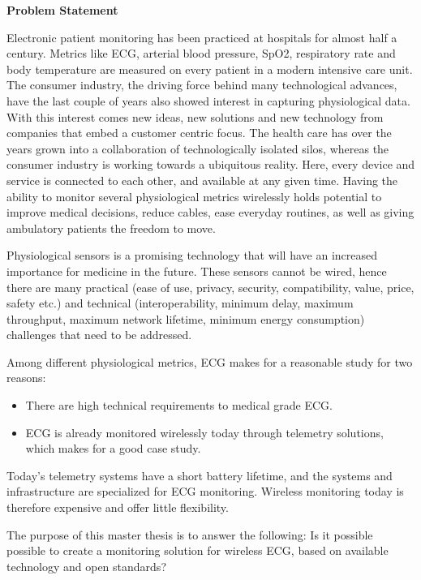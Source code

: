 
\noindent \textbf{Problem Statement} 
\newline 

\noindent Electronic patient monitoring has been practiced at hospitals for almost half a century. Metrics like ECG, arterial blood pressure, SpO2, respiratory rate and body temperature are measured on every patient in a modern intensive care unit. The consumer industry, the driving force behind many technological advances, have the last couple of years also showed interest in capturing physiological data. With this interest comes new ideas, new solutions and new technology from companies that embed a customer centric focus. The health care has over the years grown into a collaboration of technologically isolated silos, whereas the consumer industry is working towards a ubiquitous reality. Here, every device and service is connected to each other, and available at any given time. Having the ability to monitor several physiological metrics wirelessly holds potential to improve medical decisions, reduce cables, ease everyday routines, as well as giving ambulatory patients the freedom to move. 

Physiological sensors is a promising technology that will have an increased importance for medicine in the future. These sensors cannot be wired, hence there are many practical (ease of use, privacy, security, compatibility, value, price, safety etc.) and technical (interoperability, minimum delay, maximum throughput, maximum network lifetime, minimum energy consumption) challenges that need to be addressed.

Among different physiological metrics, ECG makes for a reasonable study for two reasons: 
\begin{itemize}
	\item There are high technical requirements to medical grade ECG. 
	\item ECG is already monitored wirelessly today through telemetry solutions, which makes for a good case study. 
\end{itemize}

\noindent Today's telemetry systems have a short battery lifetime, and the systems and infrastructure are specialized for ECG monitoring. Wireless monitoring today is therefore expensive and offer little flexibility. 

The purpose of this master thesis is to answer the following: Is it possible possible to create a monitoring solution for wireless ECG, based on available technology and open standards? 
